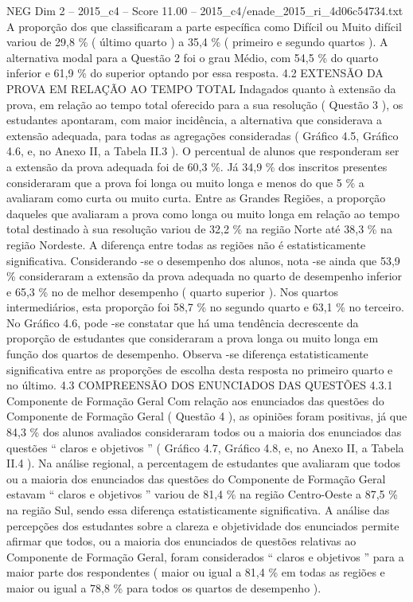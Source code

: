 \begin{textsample}{NEG Dim 2 – 2015\_c4 – Score 11.00 – 2015\_c4/enade\_2015\_ri\_4d06c54734.txt}
A proporção dos que classificaram a parte específica como Difícil ou Muito difícil variou de 29,8 \% ( último quarto ) a 35,4 \% ( primeiro e segundo quartos ).
A alternativa modal para a Questão 2 foi o grau Médio, com 54,5 \% do quarto inferior e 61,9 \% do superior optando por essa resposta. 4.2 EXTENSÃO DA PROVA EM RELAÇÃO AO TEMPO TOTAL Indagados quanto à extensão da prova, em relação ao tempo total oferecido para a sua resolução ( Questão 3 ), os estudantes apontaram, com maior incidência, a alternativa que considerava a extensão adequada, para todas as agregações consideradas ( Gráfico 4.5, Gráfico 4.6, e, no Anexo II, a Tabela II.3 ).
O percentual de alunos que responderam ser a extensão da prova adequada foi de 60,3 \%.
Já 34,9 \% dos inscritos presentes consideraram que a prova foi longa ou muito longa e menos do que 5 \% a avaliaram como curta ou muito curta.
Entre as Grandes Regiões, a proporção daqueles que avaliaram a prova como longa ou muito longa em relação ao tempo total destinado à sua resolução variou de 32,2 \% na região Norte até 38,3 \% na região Nordeste.
A diferença entre todas as regiões não é estatisticamente significativa.
Considerando -se o desempenho dos alunos, nota -se ainda que 53,9 \% consideraram a extensão da prova adequada no quarto de desempenho inferior e 65,3 \% no de melhor desempenho ( quarto superior ).
Nos quartos intermediários, esta proporção foi 58,7 \% no segundo quarto e 63,1 \% no terceiro.
No Gráfico 4.6, pode -se constatar que há uma tendência decrescente da proporção de estudantes que consideraram a prova longa ou muito longa em função dos quartos de desempenho.
Observa -se diferença estatisticamente significativa entre as proporções de escolha desta resposta no primeiro quarto e no último. 4.3 COMPREENSÃO DOS ENUNCIADOS DAS QUESTÕES 4.3.1 Componente de Formação Geral Com relação aos enunciados das questões do Componente de Formação Geral ( Questão 4 ), as opiniões foram positivas, já que 84,3 \% dos alunos avaliados consideraram todos ou a maioria dos enunciados das questões “ claros e objetivos ” ( Gráfico 4.7, Gráfico 4.8, e, no Anexo II, a Tabela II.4 ).
Na análise regional, a percentagem de estudantes que avaliaram que todos ou a maioria dos enunciados das questões do Componente de Formação Geral estavam “ claros e objetivos ” variou de 81,4 \% na região Centro-Oeste a 87,5 \% na região Sul, sendo essa diferença estatisticamente significativa.
A análise das percepções dos estudantes sobre a clareza e objetividade dos enunciados permite afirmar que todos, ou a maioria dos enunciados de questões relativas ao Componente de Formação Geral, foram considerados “ claros e objetivos ” para a maior parte dos respondentes ( maior ou igual a 81,4 \% em todas as regiões e maior ou igual a 78,8 \% para todos os quartos de desempenho ).

\end{textsample}

